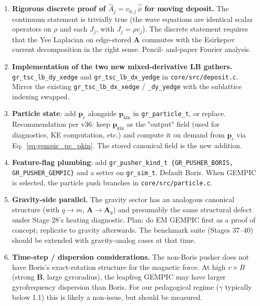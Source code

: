 \documentclass[11pt,a4paper]{article}
\newcommand{\vv}[1]{\mathbf{#1}}
\begin{document}
\begin{enumerate}
  \item \textbf{Rigorous discrete proof of
    $\hat{A}_j = v_{0,j}\,\hat{\phi}$ for moving deposit.}
    The continuum statement is trivially true (the wave equations
    are identical scalar operators on $\rho$ and each $J_j$, with
    $J_j = \rho v_j$).  The discrete statement requires that the
    Yee Laplacian on edge-stored $\vv{A}$ commutes with the
    Esirkepov current decomposition in the right sense.  Pencil-
    and-paper Fourier analysis.
  \item \textbf{Implementation of the two new mixed-derivative LB
    gathers.}  \texttt{gr\_tsc\_lb\_dy\_xedge} and
    \texttt{gr\_tsc\_lb\_dx\_yedge} in
    \texttt{core/src/deposit.c}.  Mirror the existing
    \texttt{gr\_tsc\_lb\_dx\_xedge} / \texttt{\_dy\_yedge} with the
    sublattice indexing swapped.
  \item \textbf{Particle state}: add $\vv{p}_c$ alongside
    $\vv{p}_{\mathrm{kin}}$ in \texttt{gr\_particle\_t}, or replace.
    Recommendation per v36: keep $\vv{p}_{\mathrm{kin}}$ as the
    "output" field (used for diagnostics, KE computation, etc.) and
    compute it on demand from $\vv{p}_c$ via Eq.~\eqref{eq:gempic_pc_pkin}.
    The stored canonical field is the new addition.
  \item \textbf{Feature-flag plumbing}: add
    \texttt{gr\_pusher\_kind\_t \{GR\_PUSHER\_BORIS, GR\_PUSHER\_GEMPIC\}}
    and a setter on \texttt{gr\_sim\_t}.  Default Boris.  When GEMPIC
    is selected, the particle push branches in
    \texttt{core/src/particle.c}.
  \item \textbf{Gravity-side parallel.}  The gravity sector has an
    analogous canonical structure (with $q \to m$, $\vv{A} \to
    \vv{A}_g$) and presumably the same structural defect under
    Stage 28's heating diagnostic.  Plan: do EM GEMPIC first as a
    proof of concept; replicate to gravity afterwards.  The
    benchmark suite (Stages 37--40) should be extended with
    gravity-analog cases at that time.
  \item \textbf{Time-step / dispersion considerations.}
    The non-Boris pusher does not have Boris's exact-rotation
    structure for the magnetic force.  At high $v\times B$
    (strong $\vv{B}$, large gyroradius), the leapfrog GEMPIC may
    have larger gyrofrequency dispersion than Boris.  For our
    pedagogical regime ($\gamma$ typically below 1.1) this is
    likely a non-issue, but should be measured.
\end{enumerate}
\end{document}
